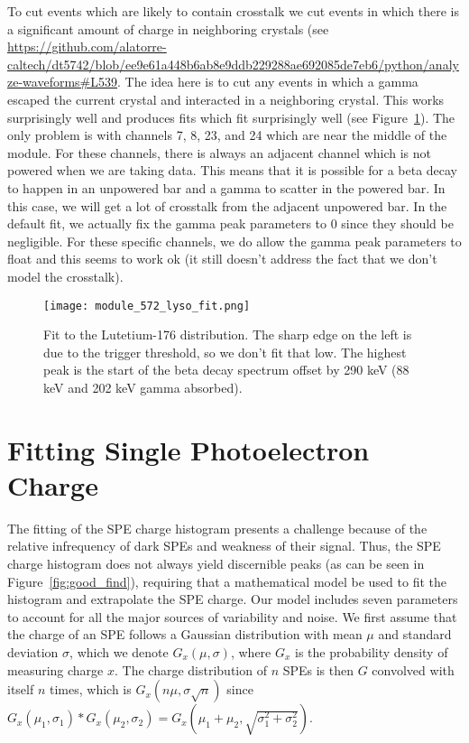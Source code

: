 \documentclass[12pt,openright,twoside]{report}
\begin{document}
To cut events which are likely to contain crosstalk we cut events in which
there is a significant amount of charge in neighboring crystals (see
\url{https://github.com/alatorre-caltech/dt5742/blob/ee9e61a448b6ab8e9ddb229288ae692085de7eb6/python/analyze-waveforms#L539}.
The idea here is to cut any events in which a gamma escaped the current crystal
and interacted in a neighboring crystal. This works surprisingly well and
produces fits which fit surprisingly well (see
Figure~\ref{fig:module-572-lyso-fit}). The only problem is with channels 7, 8,
23, and 24 which are near the middle of the module. For these channels, there
is always an adjacent channel which is not powered when we are taking data.
This means that it is possible for a beta decay to happen in an unpowered bar
and a gamma to scatter in the powered bar. In this case, we will get a lot of
crosstalk from the adjacent unpowered bar. In the default fit, we actually fix
the gamma peak parameters to 0 since they should be negligible. For these
specific channels, we do allow the gamma peak parameters to float and this
seems to work ok (it still doesn't address the fact that we don't model the
crosstalk).

\begin{figure}
\centering
\texttt{[image: module\_572\_lyso\_fit.png]}
\caption[Fit to the Lutetium-176 distribution.]{Fit to the Lutetium-176 distribution. The sharp edge on the left is due to the trigger threshold, so we don't fit that low. The highest peak is the start of the beta decay spectrum offset by 290 keV (88 keV and 202 keV gamma absorbed).}
\label{fig:module-572-lyso-fit}
\end{figure}

\chapter{Fitting Single Photoelectron Charge}

The fitting of the SPE charge histogram presents a challenge because of the
relative infrequency of dark SPEs and weakness of their signal. Thus, the SPE
charge histogram does not always yield discernible peaks (as can be seen in
Figure~\ref{fig:good_find}), requiring that a mathematical model be used to fit
the histogram and extrapolate the SPE charge. Our model includes seven
parameters to account for all the major sources of variability and noise. We
first assume that the charge of an SPE follows a Gaussian distribution with
mean $\mu$ and standard deviation $\sigma$, which we denote $G_x(\mu, \sigma)$,
where $G_x$ is the probability density of measuring charge $x$. The charge
distribution of $n$ SPEs is then $G$ convolved with itself $n$ times, which is
$G_x(n\mu, \sigma\sqrt{n})$ since $G_x(\mu_1, \sigma_1) * G_x(\mu_2, \sigma_2)
= G_x(\mu_1 + \mu_2, \sqrt{\sigma_1^2 + \sigma_2^2})$.
\end{document}
